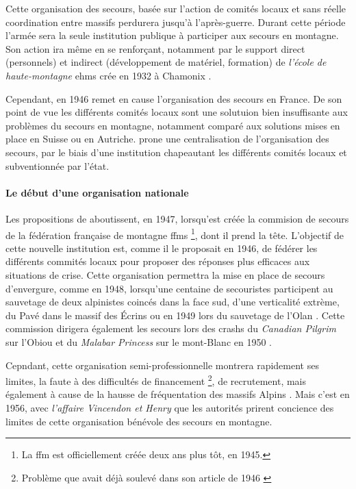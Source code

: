 Cette organisation des secours, basée sur l'action de comités locaux
et sans réelle coordination entre massifs perdurera jusqu'à
l'après-guerre. Durant cette période l'armée sera la seule institution
publique à participer aux secours en montagne. Son action ira même en
se renforçant, notamment par le support direct (personnels) et
indirect (développement de matériel, formation) de \emph{l'école de
  haute-montagne} \acp{ehm} crée en 1932 à Chamonix
\autocite{Mezin2016}.

Cependant, en 1946 \textcite{Devies1946} remet en cause l'organisation
des secours en France. De son point de vue les différents comités
locaux sont une solutuion bien insuffisante aux problèmes du secours
en montagne, notamment comparé aux solutions mises en place en Suisse
ou en Autriche.  prone une centralisation de
l'organisation des secours, par le biais d'une institution chapeautant
les différents comités locaux et subventionnée par l'état.

\paragraph{Le début d'une organisation nationale}

Les propositions de  aboutissent, en 1947, lorsqu'est
créée la commision de secours de la fédération française de montagne
\acp{ffm} \footnote{La \ac{ffm} est officiellement créée deux ans plus
  tôt, en 1945.}, dont il prend la tête. L'objectif de cette nouvelle
institution est, comme il le proposait en 1946, de fédérer les
différents commités locaux pour proposer des réponses plus efficaces
aux situations de crise. Cette organisation permettra la mise en place
de secours d'envergure, comme en 1948, lorsqu'une centaine de
secouristes participent au sauvetage de deux alpinistes coincés dans
la face sud, d'une verticalité extrème, du Pavé dans le massif des
Écrins \autocite{Romanaz2018} ou en 1949 lors du sauvetage de l'Olan
\autocite{Mollaret1993}. Cette commission dirigera également les
secours lors des crashs du \emph{Canadian Pilgrim} sur l'Obiou et du
\emph{Malabar Princess} sur le mont-Blanc en 1950
\autocite{CFDLD,Mollaret1993,SDSM2013}.

Cepndant, cette organisation semi-professionnelle montrera rapidement
ses limites, la faute à des difficultés de financement
\footnote{Problème que  avait déjà soulevé dans son
  article de 1946 \autocite{Devies1946}}, de recrutement, mais
également à cause de la hausse de fréquentation des massifs Alpins
\autocite{CFDLD}. Mais c'est en 1956, avec \emph{l'affaire Vincendon
  et Henry} que les autorités prirent concience des limites de cette
organisation bénévole des secours en montagne.

